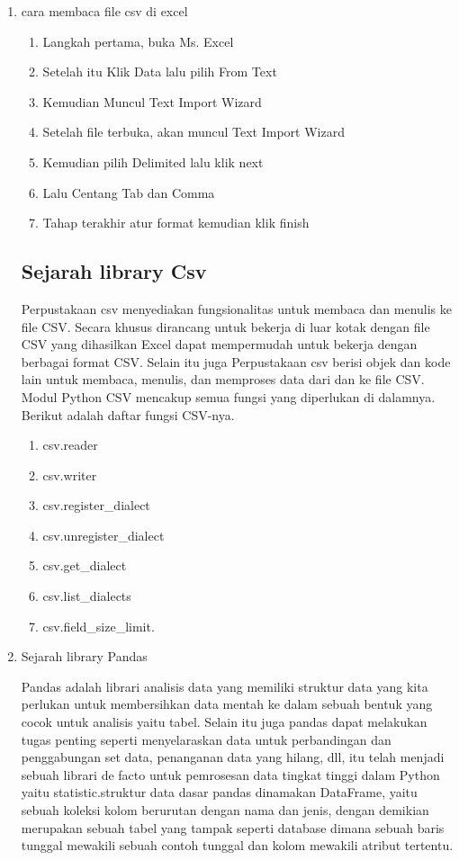 \begin{enumerate}
	\item{cara membaca file csv di excel}
	
	\begin{enumerate}
	\item Langkah pertama, buka Ms. Excel 
	\item Setelah itu Klik Data lalu pilih From Text
	\item Kemudian Muncul Text  Import Wizard
	\item Setelah file terbuka, akan muncul Text Import Wizard
	\item Kemudian pilih Delimited lalu klik next
	\item Lalu Centang Tab dan Comma
	\item Tahap terakhir atur format kemudian klik finish
\end{enumerate}

\subsection {Sejarah library Csv}
\par Perpustakaan csv menyediakan fungsionalitas untuk membaca dan menulis ke file CSV.  
Secara khusus dirancang untuk bekerja di luar kotak dengan file CSV yang dihasilkan Excel dapat mempermudah untuk bekerja dengan berbagai format CSV.
Selain itu juga Perpustakaan csv berisi objek dan kode lain untuk membaca, menulis, dan memproses data dari dan ke file CSV.
Modul Python CSV mencakup semua fungsi yang diperlukan di dalamnya. Berikut adalah daftar fungsi CSV-nya.
\begin{enumerate}
\item csv.reader 
\item csv.writer
\item csv.register\_dialect 
\item csv.unregister\_dialect 
\item csv.get\_dialect 
\item csv.list\_dialects 
\item csv.field\_size\_limit.
\end{enumerate}

\item{Sejarah library Pandas}
\par Pandas adalah  librari analisis data yang memiliki struktur data yang kita perlukan untuk membersihkan data 
mentah ke dalam sebuah bentuk yang cocok untuk analisis yaitu tabel. Selain itu juga   pandas dapat melakukan tugas penting 
seperti menyelaraskan data untuk perbandingan dan penggabungan set data, penanganan data yang hilang, dll, itu telah menjadi sebuah librari de facto untuk pemrosesan data 
tingkat tinggi dalam Python yaitu statistic.struktur data dasar pandas dinamakan DataFrame, yaitu sebuah koleksi kolom berurutan dengan nama dan jenis, 
dengan demikian merupakan sebuah tabel yang tampak seperti database dimana sebuah baris tunggal mewakili sebuah contoh tunggal dan kolom mewakili atribut tertentu.


\end{enumerate}
